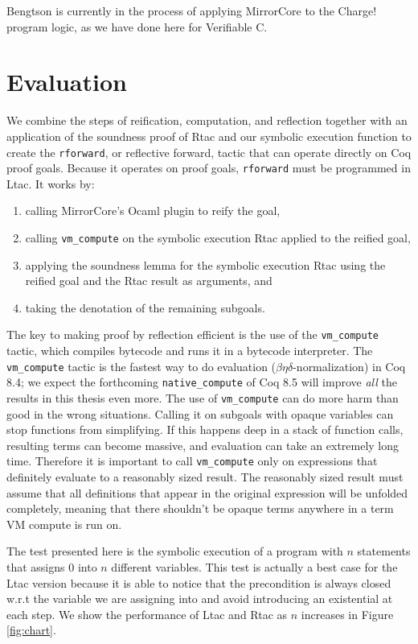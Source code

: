 \documentclass{puthesis}
\begin{document}
Bengtson is currently in the process of applying
MirrorCore to the Charge! program logic, as we have done here
for Verifiable C.

\chapter{Evaluation}
\label{ch:evaluation}
We combine the steps of reification, computation, and reflection
together with an application of the soundness proof of Rtac and our
symbolic execution function to create the \lstinline|rforward|, or
reflective forward, tactic that can operate directly on Coq proof
goals. Because it operates on proof goals, \lstinline|rforward| must
be programmed in Ltac.  It works by:
\begin{enumerate}
\item calling MirrorCore's Ocaml plugin to reify the goal,
\item calling \lstinline|vm_compute| on the symbolic execution Rtac
  applied to the reified goal,
\item applying the soundness lemma for the symbolic execution Rtac
  using the reified goal and the Rtac result as arguments, and
\item taking the denotation of the remaining subgoals.
\end{enumerate}
The key to making proof by reflection efficient is the use of the
\lstinline|vm_compute| tactic, which compiles bytecode and runs it in
a bytecode interpreter. The \lstinline|vm_compute| tactic is the
fastest way to do evaluation ($\beta\eta\delta$-normalization) in Coq
8.4; we expect the forthcoming \lstinline{native_compute} of Coq 8.5
will improve \emph{all} the results in this thesis even more.  The use
of \lstinline|vm_compute| can do more harm than good in the wrong
situations. Calling it on subgoals with opaque variables can stop
functions from simplifying. If this happens deep in a stack of
function calls, resulting terms can become massive, and evaluation can
take an extremely long time. Therefore it is important to call
\lstinline|vm_compute| only on expressions that definitely evaluate to
a reasonably sized result. The reasonably sized result must assume
that all definitions that appear in the original expression will be
unfolded completely, meaning that there shouldn't be opaque terms
anywhere in a term VM compute is run on.
  
The test presented here is the symbolic execution of a program with
$n$ statements that assigns $0$ into $n$ different variables. This
test is actually a best case for the Ltac version because it is able
to notice that the precondition is always closed w.r.t the variable we
are assigning into and avoid introducing an existential at each
step. 
We show the performance of Ltac and
Rtac as $n$ increases in Figure \ref{fig:chart}.
\end{document}
